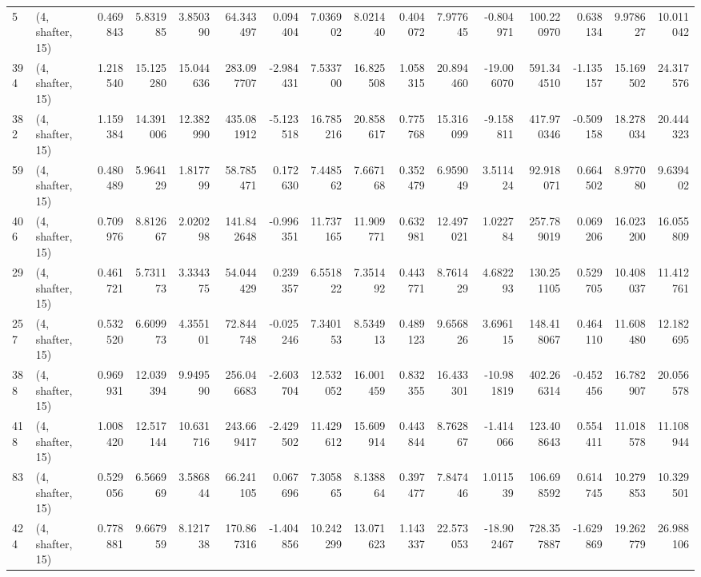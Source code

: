 \begin{tabular}{llrrrrrrrrrrrrrr}
5   &  (4, shafter, 15) &   0.469843 &   5.831985 &   3.850390 &    64.343497 &   0.094404 &   7.036902 &   8.021440 &  0.404072 &   7.977645 &  -0.804971 &   100.220970 &   0.638134 &   9.978627 &  10.011042 \\
394 &  (4, shafter, 15) &   1.218540 &  15.125280 &  15.044636 &   283.097707 &  -2.984431 &   7.533700 &  16.825508 &  1.058315 &  20.894460 & -19.006070 &   591.344510 &  -1.135157 &  15.169502 &  24.317576 \\
382 &  (4, shafter, 15) &   1.159384 &  14.391006 &  12.382990 &   435.081912 &  -5.123518 &  16.785216 &  20.858617 &  0.775768 &  15.316099 &  -9.158811 &   417.970346 &  -0.509158 &  18.278034 &  20.444323 \\
59  &  (4, shafter, 15) &   0.480489 &   5.964129 &   1.817799 &    58.785471 &   0.172630 &   7.448562 &   7.667168 &  0.352479 &   6.959049 &   3.511424 &    92.918071 &   0.664502 &   8.977080 &   9.639402 \\
406 &  (4, shafter, 15) &   0.709976 &   8.812667 &   2.020298 &   141.842648 &  -0.996351 &  11.737165 &  11.909771 &  0.632981 &  12.497021 &   1.022784 &   257.789019 &   0.069206 &  16.023200 &  16.055809 \\
29  &  (4, shafter, 15) &   0.461721 &   5.731173 &   3.334375 &    54.044429 &   0.239357 &   6.551822 &   7.351492 &  0.443771 &   8.761429 &   4.682293 &   130.251105 &   0.529705 &  10.408037 &  11.412761 \\
257 &  (4, shafter, 15) &   0.532520 &   6.609973 &   4.355101 &    72.844748 &  -0.025246 &   7.340153 &   8.534913 &  0.489123 &   9.656826 &   3.696115 &   148.418067 &   0.464110 &  11.608480 &  12.182695 \\
388 &  (4, shafter, 15) &   0.969931 &  12.039394 &   9.949590 &   256.046683 &  -2.603704 &  12.532052 &  16.001459 &  0.832355 &  16.433301 & -10.981819 &   402.266314 &  -0.452456 &  16.782907 &  20.056578 \\
418 &  (4, shafter, 15) &   1.008420 &  12.517144 &  10.631716 &   243.669417 &  -2.429502 &  11.429612 &  15.609914 &  0.443844 &   8.762867 &  -1.414066 &   123.408643 &   0.554411 &  11.018578 &  11.108944 \\
83  &  (4, shafter, 15) &   0.529056 &   6.566969 &   3.586844 &    66.241105 &   0.067696 &   7.305865 &   8.138864 &  0.397477 &   7.847446 &   1.011539 &   106.698592 &   0.614745 &  10.279853 &  10.329501 \\
424 &  (4, shafter, 15) &   0.778881 &   9.667959 &   8.121738 &   170.867316 &  -1.404856 &  10.242299 &  13.071623 &  1.143337 &  22.573053 & -18.902467 &   728.357887 &  -1.629869 &  19.262779 &  26.988106 \\

\end{tabular}
